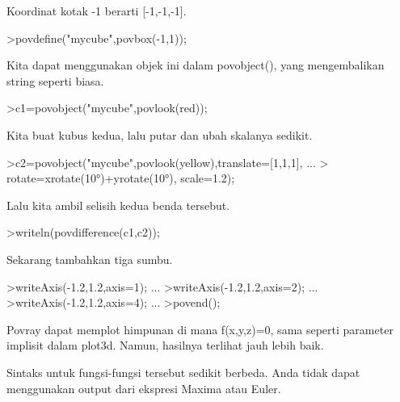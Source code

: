 \documentclass[a4paper,10pt]{article}
\begin{document}
\begin{eulernotebook}
\begin{eulercomment}
\begin{eulercomment}
\begin{eulercomment}
\begin{eulercomment}
\begin{eulercomment}
\begin{eulercomment}
\begin{eulercomment}
\begin{eulercomment}
\begin{eulercomment}
\begin{eulercomment}
\begin{eulercomment}
\begin{eulercomment}
\begin{eulercomment}
\begin{eulercomment}
\begin{eulercomment}
\begin{eulercomment}
\begin{eulercomment}
Koordinat kotak -1 berarti [-1,-1,-1].
\end{eulercomment}
\begin{eulerprompt}
>povdefine("mycube",povbox(-1,1));
\end{eulerprompt}
\begin{eulercomment}
Kita dapat menggunakan objek ini dalam povobject(), yang mengembalikan
string seperti biasa.
\end{eulercomment}
\begin{eulerprompt}
>c1=povobject("mycube",povlook(red));
\end{eulerprompt}
\begin{eulercomment}
Kita buat kubus kedua, lalu putar dan ubah skalanya sedikit.
\end{eulercomment}
\begin{eulerprompt}
>c2=povobject("mycube",povlook(yellow),translate=[1,1,1], ...
>  rotate=xrotate(10°)+yrotate(10°), scale=1.2);
\end{eulerprompt}
\begin{eulercomment}
Lalu kita ambil selisih kedua benda tersebut.
\end{eulercomment}
\begin{eulerprompt}
>writeln(povdifference(c1,c2));
\end{eulerprompt}
\begin{eulercomment}
Sekarang tambahkan tiga sumbu.
\end{eulercomment}
\begin{eulerprompt}
>writeAxis(-1.2,1.2,axis=1); ...
>writeAxis(-1.2,1.2,axis=2); ...
>writeAxis(-1.2,1.2,axis=4); ...
>povend();
\end{eulerprompt}
\begin{eulercomment}
Povray dapat memplot himpunan di mana f(x,y,z)=0, sama seperti
parameter implisit dalam plot3d. Namun, hasilnya terlihat jauh lebih
baik.

Sintaks untuk fungsi-fungsi tersebut sedikit berbeda. Anda tidak dapat
menggunakan output dari ekspresi Maxima atau Euler.


\end{eulercomment}
\end{eulercomment}
\end{eulercomment}
\end{eulercomment}
\end{eulercomment}
\end{eulercomment}
\end{eulercomment}
\end{eulercomment}
\end{eulercomment}
\end{eulercomment}
\end{eulercomment}
\end{eulercomment}
\end{eulercomment}
\end{eulercomment}
\end{eulercomment}
\end{eulercomment}
\end{eulercomment}
\end{eulernotebook}
\end{document}
